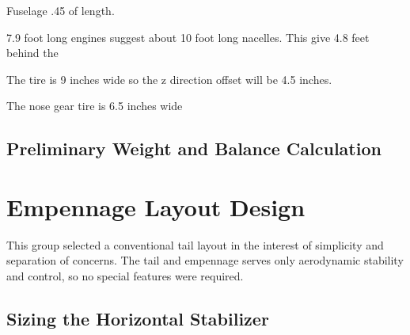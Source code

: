 \documentclass[conf]{new-aiaa}
\begin{document}
Fuselage .45 of length.

7.9 foot long engines suggest about 10 foot long nacelles. This give 4.8 feet behind the 

The tire is 9 inches wide so the z direction offset will be 4.5 inches.

The nose gear tire is 6.5 inches wide


\subsection{Preliminary Weight and Balance Calculation}


\section{Empennage Layout Design}

This group selected a conventional tail layout in the interest of simplicity and separation of concerns. The tail and empennage serves only aerodynamic stability and control, so no special features were required.

\subsection{Sizing the Horizontal Stabilizer} %
\end{document}
